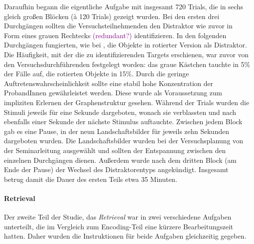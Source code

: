 Daraufhin begann die eigentliche Aufgabe mit insgesamt 720 Trials, die in sechs gleich großen Blöcken (à 120 Trials) gezeigt wurden. Bei den ersten drei Durchgängen sollten die Versuchsteilnehmenden den Distraktor wie zuvor in Form eines grauen Rechtecks \textcolor{purple}{(redundant?)} identifizieren. In den folgenden Durchgängen fungierten, wie bei \citet{Schapiro2013}, die Objekte in rotierter Version als Distraktor. Die Häufigkeit, mit der die zu identifizierenden Targets erschienen, war zuvor von den Versuchsdurchführenden festgelegt worden: das graue Kästchen tauchte in 5\% der Fälle auf, die rotierten Objekte in 15\%. Durch die geringe Auftretenswahrscheinlichkeit sollte eine stabil hohe Konzentration der ProbandInnen gewährleistet werden. Diese wurde als Voraussetzung zum impliziten Erlernen der Graphenstruktur gesehen.
Während der Trials wurden die Stimuli jeweils für eine Sekunde dargeboten, wonach sie verblassten und nach ebenfalls einer Sekunde der nächste Stimulus auftauchte. Zwischen jedem Block gab es eine Pause, in der neun Landschaftsbilder für jeweils zehn Sekunden dargeboten wurden. Die Landschaftsbilder wurden bei der Versuchsplanung von der Seminarleitung ausgewählt und sollten der Entspannung zwischen den einzelnen Durchgängen dienen. Außerdem wurde nach dem dritten Block (am Ende der Pause) der Wechsel des Distraktorentyps angekündigt. Insgesamt betrug damit die Dauer des ersten Teils etwa 35 Minuten.

\paragraph{Retrieval} Der zweite Teil der Studie, das \textit{Retrieval} war in zwei verschiedene Aufgaben unterteilt, die im Vergleich zum Encoding-Teil eine kürzere Bearbeitungszeit hatten. Daher wurden die Instruktionen für beide Aufgaben gleichzeitig gegeben.

